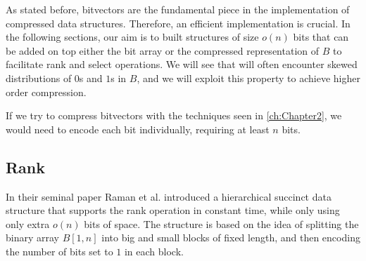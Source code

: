 \begin{example}

\end{example}

\noindent As stated before, bitvectors are the fundamental piece in the implementation of compressed data structures. Therefore, an efficient implementation is crucial. In the following sections, our aim is to built structures of size $o(n)$ bits that can be added on top either the bit array or the compressed representation of $B$ to facilitate rank and select operations. We will see that will often encounter skewed distributions of $0$s and $1$s in $B$, and we will exploit this property to achieve higher order compression.

\begin{remark}
    If we try to compress bitvectors with the techniques seen in \autoref{ch:Chapter2}, we would need to encode each bit individually, requiring at least $n$ bits.
\end{remark}

\subsection{Rank} \label{subsec:rank}

In their seminal paper \cite{RRR2002} Raman et al. introduced a hierarchical succinct data structure that supports the rank operation in constant time, while only using only extra $o(n)$  bits of space. The structure is based on the idea of splitting the binary array $B[1, n]$ into big and small blocks of fixed length, and then encoding the number of bits set to $1$ in each block.

